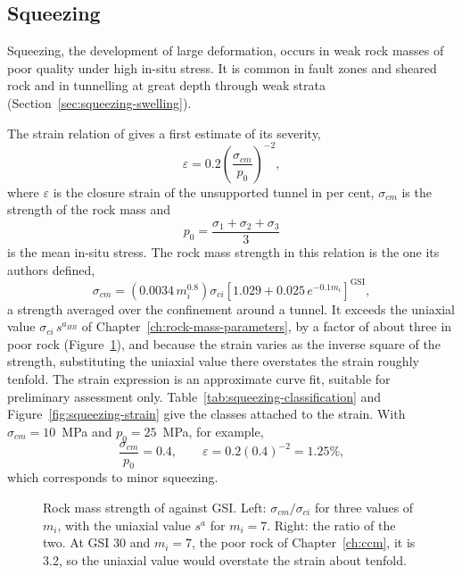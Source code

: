 \subsection{Squeezing}
\label{sec:screening-squeezing}

Squeezing, the development of large deformation, occurs in weak rock masses
of poor quality under high in-situ stress. It is common in fault zones and
sheared rock and in tunnelling at great depth through weak strata
(Section~\ref{sec:squeezing-swelling}).

The strain relation of \citet{hoekmarinos2000squeezing} gives a first
estimate of its severity,
\[
\varepsilon = 0.2\left(\frac{\sigma_{cm}}{p_0}\right)^{-2} ,
\]
where $\varepsilon$ is the closure strain of the unsupported tunnel in per
cent, \(\sigma_{cm}\) is the strength of the rock mass and
\[
p_0 = \frac{\sigma_1+\sigma_2+\sigma_3}{3}
\]
is the mean in-situ stress. The rock mass strength in this relation is the
one its authors defined,
\[
\sigma_{cm} = \left(0.0034\,m_i^{0.8}\right)\sigma_{ci}
\left[1.029 + 0.025\,e^{-0.1 m_i}\right]^{\mathrm{GSI}} ,
\]
a strength averaged over the confinement around a tunnel. It exceeds the
uniaxial value \(\sigma_{ci}\,s^{a_{HB}}\) of
Chapter~\ref{ch:rock-mass-parameters}, by a factor of about three in poor
rock (Figure~\ref{fig:rock-mass-strength-hm}), and because the strain varies as the inverse square of the strength,
substituting the uniaxial value there overstates the strain roughly
tenfold. The strain expression is an approximate curve fit, suitable for
preliminary assessment only.
Table~\ref{tab:squeezing-classification} and Figure~\ref{fig:squeezing-strain}
give the classes attached to the strain. With $\sigma_{cm} = 10$~MPa and $p_0 = 25$~MPa, for example,
\[
\frac{\sigma_{cm}}{p_0}=0.4 ,
\qquad
\varepsilon = 0.2(0.4)^{-2} = 1.25\% ,
\]
which corresponds to minor squeezing.

\begin{figure}[htbp]
\centering
{}
\caption{Rock mass strength of \citet{hoekmarinos2000squeezing} against GSI. Left: $\sigma_{cm}/\sigma_{ci}$ for three values of $m_i$, with the uniaxial value $s^{a}$ for $m_i = 7$. Right: the ratio of the two. At GSI 30 and $m_i = 7$, the poor rock of Chapter~\ref{ch:ccm}, it is 3.2, so the uniaxial value would overstate the strain about tenfold.}
\label{fig:rock-mass-strength-hm}
\end{figure}

